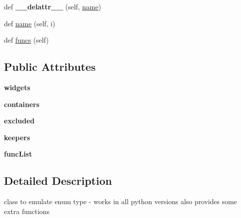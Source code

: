 \begin{DoxyCompactItemize}
\item 
\mbox{\label{class_python_01_g_u_i_1_1appjar_1_1_enum_a6add6c308fd00bda79dd1ff55e52285c}} 
def {\bfseries \+\_\+\+\_\+delattr\+\_\+\+\_\+} (self, \hyperlink{class_python_01_g_u_i_1_1appjar_1_1_enum_a272c5483812543eeffcb4ab15822a467}{name})
\item 
def \hyperlink{class_python_01_g_u_i_1_1appjar_1_1_enum_a272c5483812543eeffcb4ab15822a467}{name} (self, i)
\item 
def \hyperlink{class_python_01_g_u_i_1_1appjar_1_1_enum_a1410577438bbf4679bd5819238f98f50}{funcs} (self)
\end{DoxyCompactItemize}
\subsection*{Public Attributes}
\begin{DoxyCompactItemize}
\item 
\mbox{\label{class_python_01_g_u_i_1_1appjar_1_1_enum_aa6a6766d49eb40b851b3b04a42a0f30b}} 
{\bfseries widgets}
\item 
\mbox{\label{class_python_01_g_u_i_1_1appjar_1_1_enum_ab7df83106dc927fe6e00076f4294bafd}} 
{\bfseries containers}
\item 
\mbox{\label{class_python_01_g_u_i_1_1appjar_1_1_enum_addafb129738bd228c09eea729ad774ad}} 
{\bfseries excluded}
\item 
\mbox{\label{class_python_01_g_u_i_1_1appjar_1_1_enum_a0f0a3d4294a7c6a3189d4ed6c17df3ff}} 
{\bfseries keepers}
\item 
\mbox{\label{class_python_01_g_u_i_1_1appjar_1_1_enum_ac3e288d10277562a8b6874ff0823729e}} 
{\bfseries func\+List}
\end{DoxyCompactItemize}


\subsection{Detailed Description}
\begin{DoxyVerb}class to emulate enum type - works in all python versions
    also provides some extra functions \end{DoxyVerb}
 

